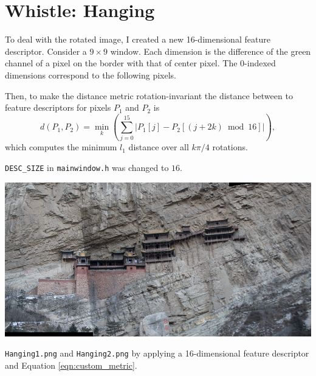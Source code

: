 \documentclass[letterpaper]{article}
\begin{document}
\section*{Whistle: Hanging}

To deal with the rotated image, I created a new 16-dimensional feature
descriptor. Consider a $9 \times 9$ window. Each dimension is the difference of
the green channel of a pixel on the border with that of center pixel. The
$0$-indexed dimensions correspond to the following pixels.

\begin{center}
  \hspace{0.25cm}
\end{center}

Then, to make the distance metric rotation-invariant the distance between to
feature descriptors for pixels $P_1$ and $P_2$ is
\begin{equation}
  d\left(P_1,P_2\right) = \min_k\left(
    \sum_{j=0}^{15}\left\lvert
      P_1\left[j\right] - P_2\left[\left(j + 2k\right) \bmod 16\right]
      \right\rvert
    \right),
    \label{eqn:custom_metric}
\end{equation}
which computes the minimum $l_1$ distance over all $k\pi/4$ rotations.

\texttt{DESC\_SIZE} in \texttt{mainwindow.h} was changed to $16$.

\begin{center}
  \includegraphics[width=\textwidth]{hanging.png}

  \texttt{Hanging1.png} and \texttt{Hanging2.png} by applying a 16-dimensional
  feature descriptor and Equation \ref{eqn:custom_metric}.
\end{center}
\end{document}
